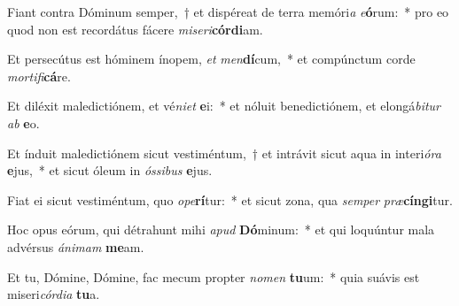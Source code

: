 \item Fiant contra Dóminum semper,~† et dispéreat de terra memóri\textit{a} \textit{e}\textbf{ó}rum:~* pro eo quod non est recordátus fácere \textit{mi}\textit{se}\textit{ri}\textbf{cór}\textbf{di}am.
\item Et persecútus est hóminem ínopem, \textit{et} \textit{men}\textbf{dí}cum,~* et compúnctum corde \textit{mor}\textit{ti}\textit{fi}\textbf{cá}re.
\item Et diléxit maledictiónem, et vé\textit{ni}\textit{et} \textbf{e}i:~* et nóluit benedictiónem, et elongá\textit{bi}\textit{tur} \textit{ab} \textbf{e}o.
\item Et índuit maledictiónem sicut vestiméntum,~† et intrávit sicut aqua in interi\textit{ó}\textit{ra} \textbf{e}jus,~* et sicut óleum in \textit{ós}\textit{si}\textit{bus} \textbf{e}jus.
\item Fiat ei sicut vestiméntum, quo \textit{o}\textit{pe}\textbf{rí}tur:~* et sicut zona, qua \textit{sem}\textit{per} \textit{præ}\textbf{cín}\textbf{gi}tur.
\item Hoc opus eórum, qui détrahunt mihi \textit{a}\textit{pud} \textbf{Dó}minum:~* et qui loquúntur mala advérsus \textit{á}\textit{ni}\textit{mam} \textbf{me}am.
\item Et tu, Dómine, Dómine, fac mecum propter \textit{no}\textit{men} \textbf{tu}um:~* quia suávis est miseri\textit{cór}\textit{di}\textit{a} \textbf{tu}a.
